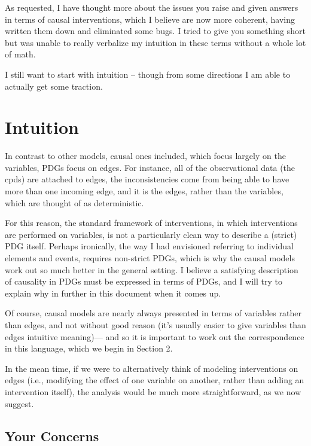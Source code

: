 \documentclass{article}
\theoremstyle{plain}
\theoremstyle{definition}
\theoremstyle{remark}
\begin{document}
As requested, I have thought more about the issues you raise and given answers in terms of causal interventions, which I believe are now more coherent, having written them down and eliminated some bugs. I tried to give you something short but was unable to really verbalize my intuition in these terms without a whole lot of math. 

I still want to start with intuition -- though from some directions I am able to actually get some traction.%

\section{Intuition}

In contrast to other models, causal ones included, which focus largely on the variables, PDGs focus on edges. For instance, all of the observational data (the cpds) are attached to edges, the inconsistencies come from being able to have more than one incoming edge, and it is the edges, rather than the variables, which are thought of as deterministic.

For this reason, the standard framework of interventions, in which interventions are performed on variables, is not a particularly clean way to describe a (strict) PDG itself. Perhaps ironically, the way I had envisioned referring to individual elements and events, requires non-strict PDGs, which is why the causal models work out so much better in the general setting. I believe a satisfying description of causality in PDGs must be expressed in terms of PDGs, and I will try to explain why in further in this document when it comes up.

Of course, causal models are nearly always presented in terms of variables rather than edges, and not without good reason (it's usually easier to give variables than edges intuitive meaning)--- and so it is important to work out the correspondence in this language, which we begin in Section 2.

In the mean time, if we were to alternatively think of modeling interventions on edges (i.e., modifying the effect of one variable on another, rather than adding an intervention itself), the analysis would be much more straightforward, as we now suggest. %


\subsection{Your Concerns}
\end{document}
